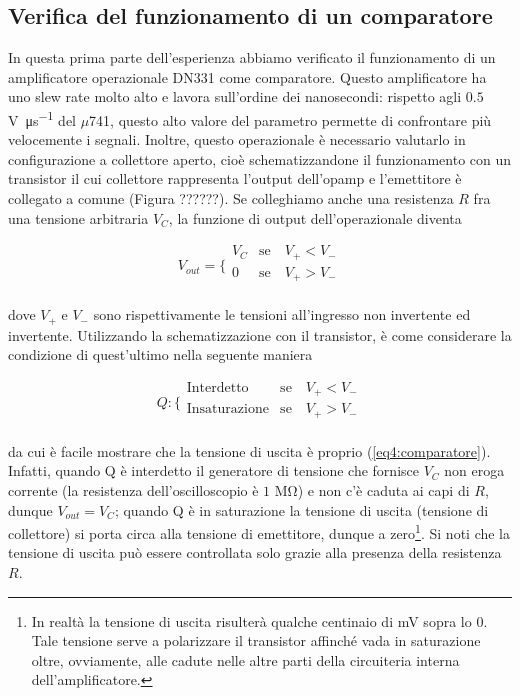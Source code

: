 \subsection{Verifica del funzionamento di un comparatore}

In questa prima parte dell'esperienza abbiamo verificato il funzionamento di un amplificatore operazionale DN331 come comparatore. Questo amplificatore ha uno slew rate molto alto e lavora sull'ordine dei nanosecondi: rispetto agli $0.5$\si{\volt\per\micro\second} del $\mu$741, questo alto valore del parametro permette di confrontare più velocemente i segnali. Inoltre, questo operazionale è necessario valutarlo in configurazione a collettore aperto, cioè schematizzandone il funzionamento con un transistor il cui collettore rappresenta l'output dell'opamp e l'emettitore è collegato a comune (Figura ??????). Se colleghiamo anche una resistenza $R$ fra una tensione arbitraria $V_C$, la funzione di output dell'operazionale diventa

\begin{equation}
V_{out} = \bigg \{
\begin{array}{rl}
V_C & \mathrm{se} \quad V_+ < V_- \\
0 & \mathrm{se} \quad V_+ > V_- \\
\end{array}
\label{eq4:comparatore}
\end{equation}

dove $V_+$ e $V_-$ sono rispettivamente le tensioni all'ingresso non invertente ed invertente. Utilizzando la schematizzazione con il transistor, è come considerare la condizione di quest'ultimo nella seguente maniera

\begin{equation}
Q : \bigg \{
\begin{array}{rl}
\mathrm{Interdetto} & \mathrm{se} \quad V_+ < V_- \\
\mathrm{In saturazione} & \mathrm{se} \quad V_+ > V_- \\
\end{array}
\label{eq4:comparatore_Q}
\end{equation}

da cui è facile mostrare che la tensione di uscita è proprio (\ref{eq4:comparatore}). Infatti, quando Q è interdetto il generatore di tensione che fornisce $V_C$ non eroga corrente (la resistenza dell'oscilloscopio è $1$ \si{\mega\ohm}) e non c'è caduta ai capi di $R$, dunque $V_{out}=V_C$; quando Q è in saturazione la tensione di uscita (tensione di collettore) si porta circa alla tensione di emettitore, dunque a zero\footnote{In realtà la tensione di uscita risulterà qualche centinaio di \si{\milli\volt} sopra lo $0$. Tale tensione serve a polarizzare il transistor affinché vada in saturazione oltre, ovviamente, alle cadute nelle altre parti della circuiteria interna dell'amplificatore.}. Si noti che la tensione di uscita può essere controllata solo grazie alla presenza della resistenza $R$.

